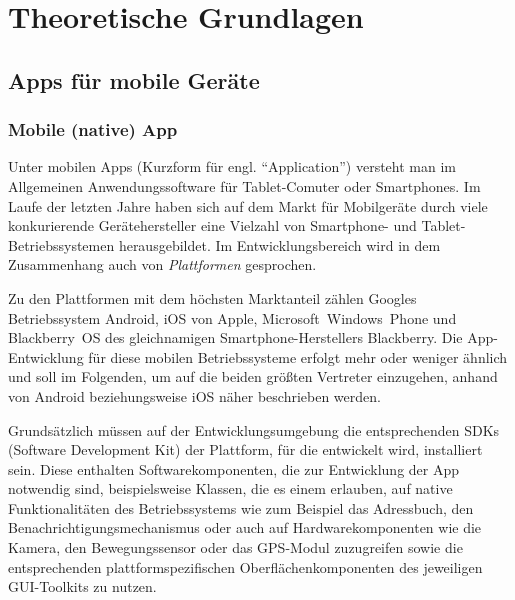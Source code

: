 \chapter{Theoretische Grundlagen}

\section{Apps für mobile Geräte} %

\subsection{Mobile (native) App} \label{native}
Unter mobilen Apps (Kurzform für engl. \enquote{Application}) versteht man im Allgemeinen Anwendungssoftware für Tablet-Comuter oder Smartphones. 
Im Laufe der letzten Jahre haben sich auf dem Markt für Mobilgeräte durch viele konkurierende Gerätehersteller eine Vielzahl von Smartphone- und Tablet-Betriebssystemen herausgebildet. 
Im Entwicklungsbereich wird in dem Zusammenhang auch von \emph{Plattformen} gesprochen.

Zu den Plattformen mit dem höchsten Marktanteil zählen Googles Betriebssystem Android, iOS von Apple, Microsoft~Windows~Phone und Blackberry~OS des gleichnamigen Smartphone-Herstellers Blackberry.\cite{platforms-marketshare}
Die App-Entwicklung für diese mobilen Betriebssysteme erfolgt mehr oder weniger ähnlich und soll im Folgenden, um auf die beiden größten Vertreter einzugehen, anhand von Android beziehungsweise iOS näher beschrieben werden.

Grundsätzlich müssen auf der Entwicklungsumgebung die entsprechenden SDKs (Software Development Kit) der Plattform, für die entwickelt wird, installiert sein. 
Diese enthalten Softwarekomponenten, die zur Entwicklung der App notwendig sind, beispielsweise Klassen, die es einem erlauben, auf native Funktionalitäten des Betriebssystems wie zum Beispiel das Adressbuch, den Benachrichtigungsmechanismus oder auch auf Hardwarekomponenten wie die Kamera, den Bewegungssensor oder das GPS-Modul zuzugreifen sowie die entsprechenden plattformspezifischen Oberflächenkomponenten des jeweiligen GUI-Toolkits zu nutzen.

